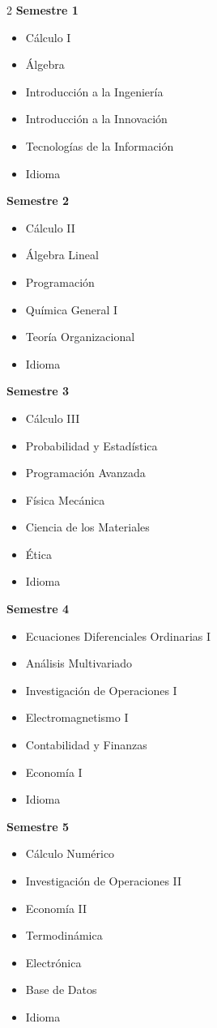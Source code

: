 \documentclass[12pt,a4paper]{article}
\begin{document}
	\begin{multicols}{2}
		\textbf{Semestre 1}
		\begin{itemize}
			\item Cálculo I
			\item Álgebra
			\item Introducción a la Ingeniería
			\item Introducción a la Innovación
			\item Tecnologías de la Información
			\item Idioma
		\end{itemize}
		
		\textbf{Semestre 2}
		\begin{itemize}
			\item Cálculo II
			\item Álgebra Lineal
			\item Programación
			\item Química General I
			\item Teoría Organizacional
			\item Idioma
		\end{itemize}
		
		\textbf{Semestre 3}
		\begin{itemize}
			\item Cálculo III
			\item Probabilidad y Estadística
			\item Programación Avanzada
			\item Física Mecánica
			\item Ciencia de los Materiales
			\item Ética
			\item Idioma
		\end{itemize}
		
		\textbf{Semestre 4}
		\begin{itemize}
			\item Ecuaciones Diferenciales Ordinarias I
			\item Análisis Multivariado
			\item Investigación de Operaciones I
			\item Electromagnetismo I
			\item Contabilidad y Finanzas
			\item Economía I
			\item Idioma
		\end{itemize}
		
		\textbf{Semestre 5}
		\begin{itemize}
			\item Cálculo Numérico
			\item Investigación de Operaciones II
			\item Economía II
			\item Termodinámica
			\item Electrónica
			\item Base de Datos
			\item Idioma
		\end{itemize}
		

\end{multicols}
\end{document}
